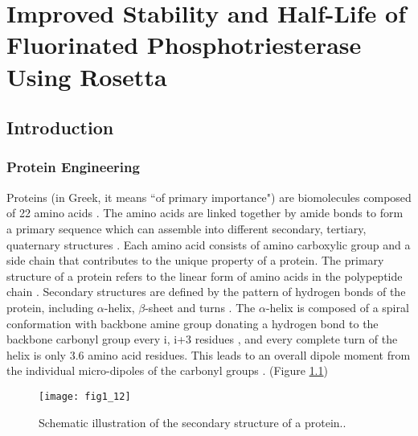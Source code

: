 \chapter{Improved Stability and Half-Life of Fluorinated Phosphotriesterase
Using Rosetta} 
\label{chap:uaa}

\begin{refsection}

\section{Introduction}

\subsection{Protein Engineering}
\label{sec:protein-engineering}

Proteins (in Greek, it means “of primary importance") are biomolecules composed
of 22 amino acids \cite{Nelson2005}. The amino acids are linked together by
amide bonds to form a primary sequence which can assemble into different
secondary, tertiary, quaternary structures \cite{Berg2002a}. Each amino acid
consists of amino carboxylic group and a side chain that contributes to the
unique property of a protein. The primary structure of a protein refers to the
linear form of amino acids in the polypeptide chain \cite{Sanger1945}.
Secondary structures are defined by the pattern of hydrogen bonds of the
protein, including $\alpha$-helix, $\beta$-sheet and turns \cite{PAULING1951}.
The $\alpha$-helix is composed of a spiral conformation with backbone amine
group donating a hydrogen bond to the backbone carbonyl group every i, i+3
residues \cite{Kabsch1983}, and every complete turn of the helix is only 3.6
amino acid residues. This leads to an overall dipole moment from the individual
micro-dipoles of the carbonyl groups \cite{Hol1978}. (Figure
\ref{fig:alpha-helix-stabilization})
\begin{figure}[htbp] 
    \centering \texttt{[image: fig1\_12]}
    \caption[Schematic illustration of the secondary structure of a
    protein.]{Schematic illustration of the secondary structure of a
        protein.\cite{Berg2002a}.} 
    \label{fig:alpha-helix-stabilization}
\end{figure}


\end{refsection}
